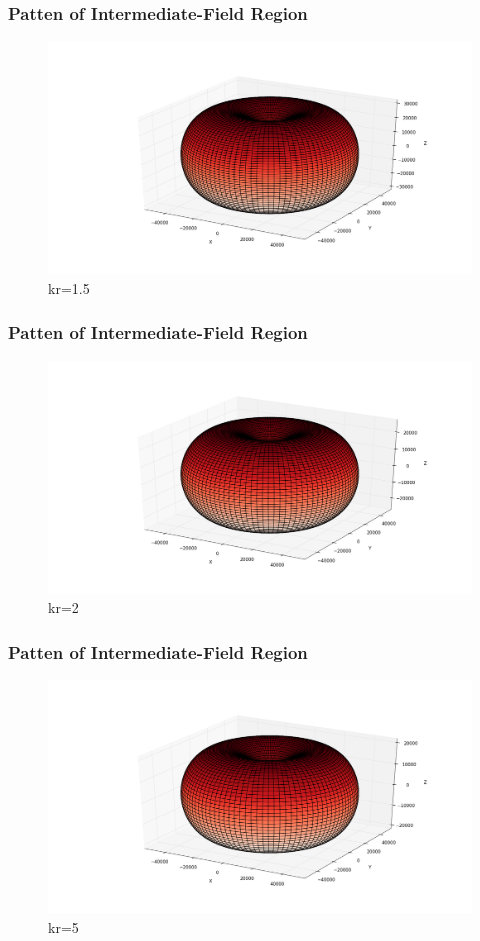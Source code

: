 \documentclass[compress=true]{beamer}
\begin{document}
\begin{frame}
  \frametitle{Patten of Intermediate-Field Region}
  \begin{figure}
    \includegraphics[height=0.68\textheight]{inter_kr_1_5_1.png}
    \caption*{\tiny{kr=1.5}}
  \end{figure}
\end{frame}
\begin{frame}
  \frametitle{Patten of Intermediate-Field Region}
  \begin{figure}
    \includegraphics[height=0.68\textheight]{inter_kr_2_1.png}
    \caption*{\tiny{kr=2}}
  \end{figure}
\end{frame}
\begin{frame}
  \frametitle{Patten of Intermediate-Field Region}
  \begin{figure}
    \includegraphics[height=0.68\textheight]{inter_kr_5_1.png}
    \caption*{\tiny{kr=5}}
  \end{figure}
\end{frame}
\end{document}
